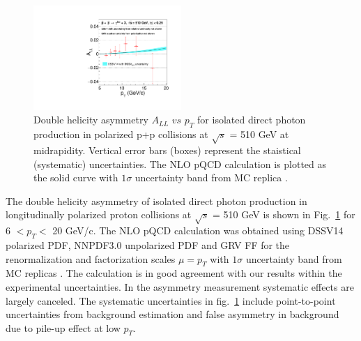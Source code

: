 \documentclass[twocolumn,letterpaper,aps,prl,longbibliography,superscriptaddress,floatfix]{revtex4-2}
\newcommand{\pT}{\ensuremath{p_T}}
\newcommand{\pizero}{\ensuremath{\pi^0}}
\begin{document}
\begin{figure}[htb]
\centering
\includegraphics[width=0.5\textwidth]{IsoPhotonALL-beam2}
\caption{Double helicity asymmetry $A_{LL}$ $vs$ $p_{T}$ for isolated direct photon production in polarized p+p collisions at $\sqrt{s}$ = 510 GeV at midrapidity. Vertical error bars (boxes) represent the staistical (systematic) uncertainties. The NLO pQCD calculation is plotted as the solid curve with $1\sigma$ uncertainty band from MC replica \cite{PhysRevLett.101.072001,PhysRevLett.113.012001,PhysRevD.100.114027}.}
\label{fig:all}
\end{figure}

The double helicity asymmetry of isolated direct photon production in longitudinally polarized proton collisions at $\sqrt{s}$ = 510 GeV is shown in Fig.~\ref{fig:all} for 6 $< p_{T} <$ 20 GeV/c. The NLO pQCD calculation was obtained using DSSV14 polarized PDF, NNPDF3.0 unpolarized PDF and GRV FF for the renormalization and factorization scales $\mu = p_T$ with $1\sigma$ uncertainty band from MC replicas \cite{PhysRevLett.101.072001,PhysRevLett.113.012001,PhysRevD.100.114027}. The calculation is in good agreement with our results within the experimental uncertainties. In the asymmetry measurement systematic effects are largely canceled. The systematic uncertainties in fig.~\ref{fig:all} include point-to-point uncertainties from background estimation and false asymmetry in background due to pile-up effect at low \pT.

\end{document}
